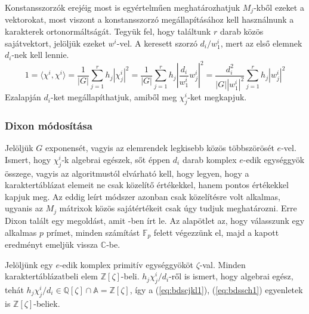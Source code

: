 Konstansszorzók erejéig most is egyértelműen meghatározhatjuk $M_j$-kből ezeket a vektorokat, most viszont a konstansszorzó megállapításához
kell használnunk a karakterek ortonormáltságát. Tegyük fel, hogy találtunk $r$ darab közös sajátvektort, jelöljük ezeket $w^i$-vel.
A keresett szorzó $d_i/w^i_1$, mert az első elemnek $d_i$-nek kell lennie.
\begin{equation}
\label{eq:bdssch2}
1 = \langle \chi^i, \chi^i \rangle = \frac{1}{|G|}\sum_{j=1}^r h_j |\chi^i_j|^2 = \frac{1}{|G|}\sum_{j=1}^r h_j \left|\frac{d_i}{w^i_1} w^i_j\right|^2 = 
\frac{d_i^2}{|G| |w^i_1|^2} \sum_{j=1}^r h_j |w^i_j|^2
\end{equation}
Ezalapján $d_i$-ket megállapíthatjuk, amiből meg $\chi^i_j$-ket megkapjuk.


\subsubsection{Dixon módosítása}
\label{subsubsec:bdsdixon}
Jelöljük $G$ exponensét, vagyis az elemrendek legkisebb közös többszörösét $e$-vel.
Ismert, hogy $\chi^i_j$-k algebrai egészek, sőt éppen $d_i$ darab komplex $e$-edik egységgyök összege,
vagyis az algoritmustól elvárható kell, hogy legyen, hogy a karaktertáblázat elemeit ne csak közelítő értékekkel, hanem pontos értékekkel kapjuk meg.
Az eddig leírt módszer azonban csak közelítésre volt alkalmas, ugyanis az $M_j$ mátrixok közös sajátértékeit csak úgy tudjuk meghatározni.
Erre Dixon talált egy megoldást, amit \cite{Dix67}-ben írt le. Az alapötlet az, hogy válasszunk egy alkalmas $p$ prímet, minden számítást $\mathbb{F}_p$
felett végezzünk el, majd a kapott eredményt emeljük vissza $\mathbb{C}$-be.

Jelöljünk egy $e$-edik komplex primitív egységgyököt $\zeta$-val. Minden karaktertáblázatbeli elem $\mathbb{Z}[\zeta]$-beli.
$h_j\chi^i_j/d_i$-ről is ismert, hogy algebrai egész, tehát $h_j\chi^i_j/d_i \in \mathbb{Q}[\zeta] \cap \mathbb{A} = \mathbb{Z}[\zeta]$, így a
(\ref{eq:bdscjkl1}), (\ref{eq:bdssch1}) egyenletek is $\mathbb{Z}[\zeta]$-beliek.


